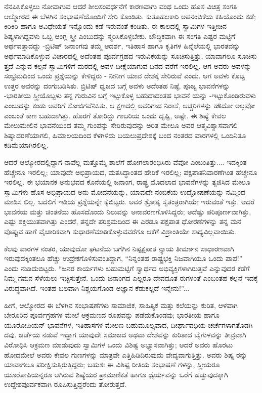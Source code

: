 ನೆನಪಿಸಿಕೊಳ್ಳಲು ನೋವಾಗುವ ಆದರೆ ಶೀಲಸಂವರ್ಧನೆಗೆ ಕಾರಣವಾಗು ವಂಥ ಒಂದು ಹೊಸ ವಿಚಿತ್ರ ಸಂಗತಿ ಆಲ್ಮೋರದ ಈ ಬೆಳಗಿನ ಸಂಭಾಷಣೆಯೊಂದಿಗೆ ಸೇರಿ ಕೊಂಡಿತು. ಕುತೂಹಲಕಾರಿ ಅಪನಂಬಿಕೆಯ ಕಹಿಯೊಂದು ಕಡೆ; ಕಿರಿಕಿರಿ ಹಾಗೂ ಅವಿಧೇಯತೆ ಇನ್ನೊಂದು ಕಡೆ ಇರುವಂತೆ ಕಂಡಿತು. ಈ ಕಾಲದಲ್ಲಿ ಸ್ವಾಮಿಗಳ ಇತ್ತೀಚಿನ ಶಿಷ್ಯಳಾಗಿದ್ದವಳು ಒಬ್ಬ ಆಂಗ್ಲ ಸ್ತ್ರೀ ಎಂಬುದನ್ನು ಸ್ಮರಿಸಿಕೊಳ್ಳಬೇಕು. ಬೌದ್ಧಿಕವಾಗಿ ಈ ಸಂಗತಿ ಎಷ್ಟರ ಮಟ್ಟಿಗೆ ಅರ್ಥವತ್ತಾದದ್ದು -ಬ್ರಿಟಿಷ್ ಜನಾಂಗವು ತಮ್ಮ ಆದರ್ಶ, ಇತಿಹಾಸ ಹಾಗೂ ಕೃತಿಗಳ ಹಿನ್ನೆಲೆಯಲ್ಲಿ ಭಾರತವನ್ನು ಅರ್ಥಮಾಡಿಕೊಳ್ಳುವ ವಿಚಾರದಲ್ಲಿ ಅದೆಂತಹ ಪೂರ್ವಗ್ರಹದ ಇರುವಿಕೆಯನ್ನು ಸೂಚಿಸುತ್ತಿತ್ತು, ಯಾವಾಗಲೂ ಸೂಚಿಸು ತ್ತದೆ ಎನ್ನುವ ಕಲ್ಪನೆ ಸ್ವಾಮಿಗಳಿಗೆ ಮಠದಲ್ಲಿ ಅವಳ ದೀಕ್ಷೆಯಾಗುವ ದಿನದ ವರೆಗೆ ಇರಲಿಲ್ಲ. ಆಗ ಅವರು ಅವಳನ್ನು ಸಂಭ್ರಮದಿಂದ ಒಂದು ಪ್ರಶ್ನೆಯನ್ನು ಕೇಳಿದ್ದರು - ನೀನೀಗ ಯಾವ ದೇಶಕ್ಕೆ ಸೇರಿರುವೆ ಎಂದು. ಆಗ ಅವಳು ಕೊಟ್ಟ ಉತ್ತರ ಅವರನ್ನು ದಂಗುಬಡಿಸಿತು. ಬ್ರಿಟಿಷ್ ಧ್ವಜದ ಬಗ್ಗೆ ಅವಳು ಅದೆಂತಹ ನಿಷ್ಠೆ, ಪೂಜ್ಯ ಭಾವನೆಗಳನ್ನು -ಭಾರತೀಯ ಸ್ತ್ರೀಯೊಬ್ಬಳು ತನ್ನ ಗುರುವಿನ ಬಗ್ಗೆ ಇಟ್ಟುಕೊಳ್ಳ ಬಹುದಾದಂತಹ ಭಾವನೆ ಯನ್ನು -ಇಟ್ಟುಕೊಂಡಿರುವಳು ಎಂಬುದನ್ನು ಕಂಡು ಅವರಿಗೆ ಸೋಜಿಗವೆನಿಸಿತು. ಆ ಕ್ಷಣದಲ್ಲಿ ಅವರಿಗಾದ ನಿರಾಸೆ, ಅಚ್ಚರಿಗಳನ್ನು ಹೌದೋ ಅಲ್ಲವೋ ಎಂಬಂತೆ ಕಾಣ ಬಹುದಾಗಿತ್ತು. ಹೊರಗೆ ತೋರಿದ್ದು ಗಾಬರಿಯ ಒಂದು ದೃಷ್ಟಿ, ಅಷ್ಟೇ. ಈ ಶಿಷ್ಯೆ ಕೇವಲ ಮೇಲುಮೇಲಿನ ಭಾವನೆಯಿಂದ ತಮ್ಮ ಗುಂಪನ್ನು ಸೇರಿರುವುದನ್ನು ಅರಿತ ಮೇಲೂ ಅವರ ಆತ್ಮವಿಶ್ವಾಸವಾಗಲಿ ಶಿಷ್ಯಾದರಣೆಯಾಗಲಿ, ಹಿಮಾಲಯದಿಂದ ಕೆಳಗಿಳಿದು ಬಯಲುಪ್ರದೇಶಕ್ಕೆ ಬಂದ ನಂತರದ ವಾರಗಳಲ್ಲಿ ಒಂದಿನಿತೂ ಕಡಿಮೆಯಾಗಿರಲಿಲ್ಲ.

ಆದರೆ ಆಲ್ಮೋರದಲ್ಲಿದ್ದಾಗ ನಾವೆಲ್ಲ ಮತ್ತೊಮ್ಮೆ ಶಾಲೆಗೆ ಹೋಗಲಾರಂಭಿಸಿರು ವೆವೋ ಎಂಬಂತಿತ್ತು.... ಇದಕ್ಕಿಂತ ಹೆಚ್ಚೇನೂ ಇರಲಿಲ್ಲ; ಯಾವುದೇ ಅಭಿಪ್ರಾಯದ, ಮತಸಿದ್ಧಾಂತದ ಹೇರಿಕೆ ಇರಲಿಲ್ಲ; ಪಕ್ಷಪಾತನಿವಾರಣೆಗಿಂತ ಹೆಚ್ಚೇನೂ ಇರಲಿಲ್ಲ. ಈ ಭಯಾನಕ ಅನುಭವದ ಕೊನೆಯಲ್ಲಿ ಜನಾಂಗ, ರಾಷ್ಟ್ರ ಮೊದಲಾದ ಭಾವನೆಗಳನ್ನು ತ್ಯಜಿಸಿದ ಮೇಲೂ ಸ್ವಾಮಿಗಳು ಹೊಸ ಅಭಿಪ್ರಾಯದ ಅನು ಮೋದನೆಯನ್ನು, ಯಾವುದೇ ನಂಬಿಕೆಯ ಉದ್ಘೋಷಣೆಯನ್ನು ನಮ್ಮಿಂದ ಮಾಡಿಸ ಲಿಲ್ಲ. ಬದಲಿಗೆ ಇಡಿಯ ಪ್ರಶ್ನೆಯನ್ನೇ ಕೈಬಿಟ್ಟರು. ಅವರ ಶ್ರೋತೃ ಸ್ವತಂತ್ರರಾಗಿಯೇ ಇರುವಂತೆ ಇತ್ತು. ಆದರೆ ಭಾವನೆಯ ಮತ್ತು ಚಿಂತನೆಯ ಹೊಸದೊಂದು ನಿಲುವನ್ನು ಅನಾವರಣಗೊಳಿಸಿದ್ದರು; ಅದೆಷ್ಟು ಪರಿಪೂರ್ಣವಾಗಿತ್ತು, ಎಷ್ಟು ಶಕ್ತಿಯುತವಾಗಿತ್ತು ಎಂದರೆ, ತನ್ನದೇ ಪರಿಶ್ರಮದಿಂದ ಈ ಎರಡೂ ಪಕ್ಷಪಾತ ಧೋರಣೆಗಳನ್ನು ತನ್ನ ಮನ ವೊಪ್ಪುವ ಹಾಗೆ ವೈಚಾರಿಕವಾಗಿ ಸುಧಾರಣೆಮಾಡಿಕೊಳ್ಳುವವರೆಗೂ ಆಕೆಗೆ ವಿಶ್ರಾಂತಿಯೇ ಸಾಧ್ಯವಿಲ್ಲವಾಯಿತು.

ಕೆಲವು ವಾರಗಳ ನಂತರ, ಯಾವುದೋ ಘಟನೆಯ ಬಗೆಗಿನ ನಿಷ್ಪಕ್ಷಪಾತ ನ್ಯಾಯ ತೀರ್ಮಾನ ಸಾಧಾರಣವಾಗಿ ಇರುವುದಕ್ಕಿಂತಲೂ ಹೆಚ್ಚು ಉದ್ರೇಕಗೊಳಿಸುವಂತಿದ್ದಾಗ, “ನಿನ್ನಂತಹ ರಾಷ್ಟ್ರಭಕ್ತಿ ನಿಜವಾಗಿಯೂ ಒಂದು ಪಾಪ!” ಎಂದು ನುಡಿದುಬಿಟ್ಟರು. “ಜನರ ಕಾರ್ಯಗಳು ಬಹುಮಟ್ಟಿಗೆ ಸ್ವಾರ್ಥದ ಅಭಿವ್ಯಕ್ತಿಗಳಾಗಿರುತ್ತವೆ ಎನ್ನುವುದರ ಕಡೆಗೆ ನಿಮ್ಮ ಗಮನ ಸೆಳೆಯಲು ಇಚ್ಛಿಸುತ್ತೇನೆ. ಒಂದು ಜನಾಂಗದ ಎಲ್ಲರೂ ದೇವದೂತ ರುಗಳಂತೆ ಎಂಬಂತಹ ಕಲ್ಪನೆ ಇದಕ್ಕೆ ವಿರುದ್ಧವಾಗಿದೆ. ಇಂತಹ ಬಲವಾಗಿ ನಿಶ್ಚಯಗೊಂಡ ಅಜ್ಞಾನ ಕೆಡುಕಲ್ಲದೆ ಇನ್ನೇನು!”...

ಹೀಗೆ, ಆಲ್ಮೋರದ ಈ ಬೆಳಗಿನ ಸಂಭಾಷಣೆಗಳು ಸಾಮಾಜಿಕ, ಸಾಹಿತ್ಯಿಕ ಮತ್ತು ಕಲೆಯನ್ನು ಕುರಿತ, ಆಳವಾಗಿ ಬೇರೂರಿದ ಪೂರ್ವಗ್ರಹಗಳ ಮೇಲೆ ಆಕ್ರಮಣದ ರೂಪವನ್ನು ಪಡೆದುಕೊಂಡವು; ಭಾರತೀಯ ಹಾಗೂ ಯೂರೋಪಿಯನ್ ಭಾವನೆಗಳ, ಇತಿಹಾಸಗಳ ಮೇಲಣ ಬಹುಮೂಲ್ಯವಾದ, ದೀರ್ಘಾವಧಿಯ ಚರ್ಚೆಗಳಾಗತೊಡಗಿ ದವು. ಚರ್ಚೆಯ ನಡುವೆ ಇದ್ದಾಗ ಯಾವುದೇ ಸಮಾಜದ ಅಥವಾ ದೇಶವನ್ನು ಕುರಿತಾದ ಬೈಗುಳವನ್ನು ತೀವ್ರವಾಗಿ ವಿರೋಧಿಸಿ ಆಕ್ರಮಣ ಮಾಡುವುದು ಸ್ವಾಮಿಗಳ ಒಂದು ವಿಶಿಷ್ಟ ಅಭ್ಯಾಸವಾಗಿತ್ತು; ಆದರೆ ಅವರು ಹೊರಟು ಹೋದಮೇಲೆ ಅವರು ಕೇವಲ ಗುಣಗಳನ್ನು ಮಾತ್ರವೇ ಎತ್ತಿಹಿಡಿದಿರುವುದು ವೇದ್ಯವಾಗುತ್ತಿತ್ತು. ಅವರು ಶಿಷ್ಯ ರನ್ನು ಯಾವಾಗಲೂ ಪರೀಕ್ಷಿಸುತ್ತಿರುತ್ತಿದ್ದರು; ಬಹುಶಃ ಈ ವಿಶಿಷ್ಟ ರೀತಿಯ ಸಂಭಾಷಣೆ ಗಳನ್ನು, ಸ್ತ್ರೀಯರೂ ಯೂರೋಪಿಯನ್ನರೂ ಆಗಿರುವ ಶಿಷ್ಯೆಯರ ಪ್ರಾಮಾಣಿಕತೆ ಹಾಗೂ ಧೈರ್ಯವನ್ನು ಒರೆಗೆ ಹಚ್ಚುವುದಕ್ಕಾಗಿ ಉದ್ದೇಶಪೂರ್ವಕವಾಗಿ ರೂಪಿಸುತ್ತಿದ್ದರೆಂದು ತೋರುತ್ತದೆ.

